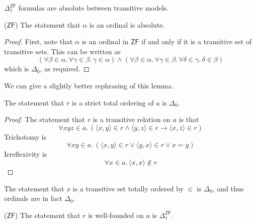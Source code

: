 \begin{corollary}
    \( \Delta_1^{\mathsf{ZF}} \) formulas are absolute between transitive models.
\end{corollary}
\begin{lemma}
    (\( \mathsf{ZF} \))
    The statement that \( \alpha \) is an ordinal is absolute.
\end{lemma}
\begin{proof}
    First, note that \( \alpha \) is an ordinal in \( \mathsf{ZF} \) if and only if it is a transitive set of transitive sets.
    This can be written as
    \[ (\forall \beta \in \alpha.\, \forall \gamma \in \beta.\, \gamma \in \alpha) \wedge (\forall \beta \in \alpha.\, \forall \gamma \in \beta.\, \forall \delta \in \gamma.\, \delta \in \beta) \]
    which is \( \Delta_0 \), as required.
\end{proof}
We can give a slightly better rephrasing of this lemma.
\begin{lemma}
    The statement that \( r \) is a strict total ordering of \( a \) is \( \Delta_0 \).
\end{lemma}
\begin{proof}
    The statement that \( r \) is a transitive relation on \( a \) is that
    \[ \forall x y z \in a.\, (\langle x, y \rangle \in r \wedge \langle y, z \rangle \in r \to \langle x, z \rangle \in r) \]
    Trichotomy is
    \[ \forall x y \in a.\, (\langle x, y \rangle \in r \vee \langle y, x \rangle \in r \vee x = y) \]
    Irreflexivity is
    \[ \forall x \in a.\, \langle x, x \rangle \notin r \]
\end{proof}
\begin{corollary}
    The statement that \( x \) is a transitive set totally ordered by \( \in \) is \( \Delta_0 \), and thus ordinals are in fact \( \Delta_0 \).
\end{corollary}
\begin{lemma}
    (\( \mathsf{ZF} \))
    The statement that \( r \) is well-founded on \( a \) is \( \Delta_1^{\mathsf{ZF}} \).
\end{lemma}
